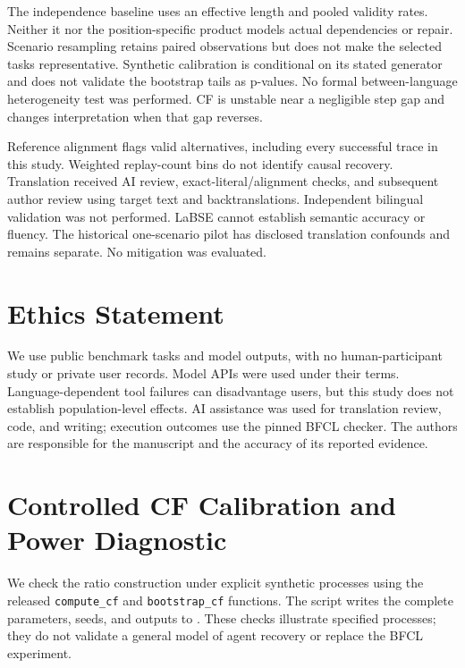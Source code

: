 \documentclass[11pt]{article}
\begin{document}
The independence baseline uses an effective length and pooled validity rates.
Neither it nor the position-specific product models actual dependencies or
repair. Scenario resampling retains paired observations but does not make
the selected tasks representative. Synthetic calibration is conditional on
its stated generator and does not validate the bootstrap tails as p-values.
No formal between-language heterogeneity test was performed. CF is unstable
near a negligible step gap and changes interpretation when that gap reverses.

Reference alignment flags valid alternatives, including every successful
trace in this study. Weighted replay-count bins do not identify causal
recovery. Translation received AI review, exact-literal/alignment checks,
and subsequent author review using target text and backtranslations.
Independent bilingual validation was not performed. LaBSE cannot establish
semantic accuracy or fluency. The historical one-scenario pilot has disclosed
translation confounds and remains separate. No mitigation was evaluated.

\section*{Ethics Statement}
We use public benchmark tasks and model outputs, with no human-participant
study or private user records. Model APIs were used under their terms.
Language-dependent tool failures can disadvantage users, but this study does
not establish population-level effects. AI assistance was used for translation
review, code, and writing; execution outcomes use the pinned BFCL checker.
The authors are responsible for the manuscript and the accuracy of its
reported evidence.



\appendix

\section{Controlled CF Calibration and Power Diagnostic}
\label{app:calibration}

We check the ratio construction under explicit synthetic processes using the
released \texttt{compute\_cf} and \texttt{bootstrap\_cf} functions. The script
 writes the complete parameters, seeds,
and outputs to .
These checks illustrate specified processes; they do not validate a general
model of agent recovery or replace the BFCL experiment.
\end{document}
